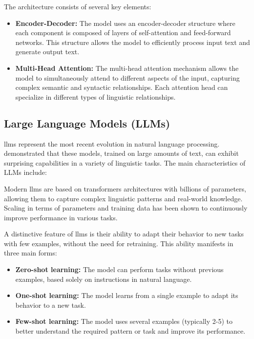 The architecture consists of several key elements:

\begin{itemize}
  \item \textbf{Encoder-Decoder:} The model uses an encoder-decoder structure where each component is composed of layers of \gls{self-attention} and \gls{feed-forward} networks. This structure allows the model to efficiently process input text and generate output text.

  \item \textbf{Multi-Head Attention:} The multi-head attention mechanism allows the model to simultaneously attend to different aspects of the input, capturing complex semantic and syntactic relationships. Each attention head can specialize in different types of linguistic relationships.
\end{itemize}

\subsection{Large Language Models (LLMs)}

\gls{llm}s represent the most recent evolution in natural language processing. \cite{brown2020language} demonstrated that these models, trained on large amounts of text, can exhibit surprising capabilities in a variety of linguistic tasks. The main characteristics of LLMs include:

Modern \gls{llm}s are based on \gls{transformers} architectures with billions of parameters, allowing them to capture complex linguistic patterns and real-world knowledge. Scaling in terms of parameters and training data has been shown to continuously improve performance in various tasks.

A distinctive feature of \gls{llm}s is their ability to adapt their behavior to new tasks with few examples, without the need for retraining. This ability manifests in three main forms:

\begin{itemize}
  \item \textbf{Zero-shot learning:} The model can perform tasks without previous examples, based solely on instructions in natural language.

  \item \textbf{One-shot learning:} The model learns from a single example to adapt its behavior to a new task.

  \item \textbf{Few-shot learning:} The model uses several examples (typically 2-5) to better understand the required pattern or task and improve its performance.
\end{itemize}

